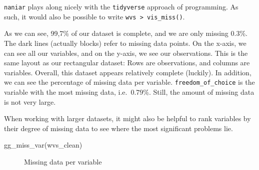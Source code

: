 \documentclass[
  letterpaper,
  DIV=11,
  numbers=noendperiod]{scrreprt}
\newenvironment{Shaded}{\begin{snugshade}}{\end{snugshade}}
\newcommand{\FunctionTok}[1]{\textcolor[rgb]{0.28,0.35,0.67}{#1}}
\newcommand{\NormalTok}[1]{\textcolor[rgb]{0.00,0.23,0.31}{#1}}
\begin{document}
\texttt{naniar} plays along nicely with the \texttt{tidyverse} approach
of programming. As such, it would also be possible to write
\texttt{wvs\ \textbar{}\textgreater{}\ vis\_miss()}.

As we can see, 99,7\% of our dataset is complete, and we are only
missing 0.3\%. The dark lines (actually blocks) refer to missing data
points. On the x-axis, we can see all our variables, and on the y-axis,
we see our observations. This is the same layout as our rectangular
dataset: Rows are observations, and columns are variables. Overall, this
dataset appears relatively complete (luckily). In addition, we can see
the percentage of missing data per variable.
\texttt{freedom\_of\_choice} is the variable with the most missing data,
i.e.~0.79\%. Still, the amount of missing data is not very large.

When working with larger datasets, it might also be helpful to rank
variables by their degree of missing data to see where the most
significant problems lie.

\begin{Shaded}
\begin{Highlighting}[]
\FunctionTok{gg\_miss\_var}\NormalTok{(wvs\_clean)}
\end{Highlighting}
\end{Shaded}

\begin{figure}[H]


\caption{\label{fig-missing-data-per-variable}Missing data per variable}

\end{figure}%
\end{document}
